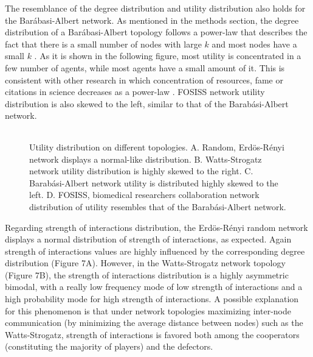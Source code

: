 \documentclass{bmcart}
\def\texttt{[image: ]}
\begin{document}
The resemblance of the degree distribution and utility distribution also holds
for the Bar\'abasi-Albert network. As mentioned in the methods section, the
degree distribution of a Bar\'abasi-Albert topology follows a power-law that
describes the fact that there is a small number of nodes with large $k$ and most
nodes have a small $k$ \cite{BarabasiAlbert:99}. As it is shown in the following
figure, most utility is concentrated in a few number of agents, while most
agents have a small amount of it. This is consistent with other research in
which concentration of resources, fame or citations in science decreases as a
power-law \cite{Simon:55,Price:1965,Merton:1968}. FOSISS network utility
distribution is also skewed to the left, similar to that of the
Barab\'asi-Albert network. \\ 


\begin{figure} [h!]
\centering
\begin{tabular}{cc}

\end{tabular}
\caption{Utility distribution on different topologies. A. Random,
  Erd\"{o}s-R\'enyi network displays a normal-like
  distribution. B. Watts-Strogatz network utility distribution is highly skewed
  to the right. C. Barab\'asi-Albert network utility is distributed highly
  skewed to the left. D. FOSISS, biomedical researchers collaboration network
  distribution of utility resembles that of the Barab\'asi-Albert
  network.}\label{histo_fitness} 
\end{figure}


Regarding strength of interactions distribution, the Erd\"{o}s-R\'enyi random
network displays a normal distribution of strength of interactions, as
expected. Again strength of interactions values are highly influenced by the
corresponding degree distribution (Figure 7A). However, in the Watts-Strogatz
network topology (Figure 7B), the strength of interactions distribution is a
highly asymmetric bimodal, with a really low frequency mode of low strength of
interactions and a high probability mode for high strength of interactions. A
possible explanation for this phenomenon is that under network topologies
maximizing inter-node communication (by minimizing the average distance between
nodes) such as the Watts-Strogatz, strength of interactions is favored both
among the cooperators (constituting the majority of players) and the
defectors. \\ 
\end{document}
